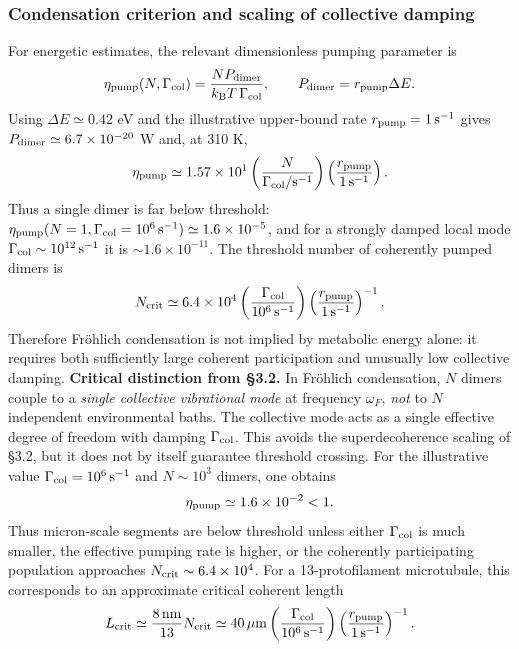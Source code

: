 \documentclass[twocolumn,10pt]{article}
\newcommand{\kB}{k_{\text{B}}}
\begin{document}
\subsubsection{Condensation criterion and scaling of collective damping}
For energetic estimates, the relevant dimensionless pumping parameter is
\begin{equation}
\eta_{\rm pump}(N,\Gamma_{\rm col})
=
\frac{N P_{\rm dimer}}{\kB T\,\Gamma_{\rm col}},
\qquad
P_{\rm dimer}=r_{\rm pump}\Delta E .
\end{equation}
Using $\Delta E\simeq0.42$ eV and the illustrative upper-bound rate
$r_{\rm pump}=1\,{\rm s}^{-1}$ gives
$P_{\rm dimer}\simeq6.7\times10^{-20}$ W and, at 310 K,
\begin{equation}
\eta_{\rm pump}
\simeq
1.57\times10^{1}
\left(\frac{N}{\Gamma_{\rm col}/{\rm s}^{-1}}\right)
\left(\frac{r_{\rm pump}}{1\,{\rm s}^{-1}}\right).
\end{equation}
Thus a single dimer is far below threshold:
$\eta_{\rm pump}(N=1,\Gamma_{\rm col}=10^6\,{\rm s}^{-1})
\simeq1.6\times10^{-5}$, and for a strongly damped local mode
$\Gamma_{\rm col}\sim10^{12}\,{\rm s}^{-1}$ it is
$\sim1.6\times10^{-11}$. The threshold number of coherently pumped dimers is
\begin{equation}
N_{\rm crit}
\simeq
6.4\times10^4
\left(\frac{\Gamma_{\rm col}}{10^6\,{\rm s}^{-1}}\right)
\left(\frac{r_{\rm pump}}{1\,{\rm s}^{-1}}\right)^{-1}.
\end{equation}
Therefore Fr\"ohlich condensation is not implied by metabolic energy alone:
it requires both sufficiently large coherent participation and unusually low
collective damping.
\textbf{Critical distinction from \S 3.2.} In Fr\"ohlich condensation, $N$
dimers couple to a \textit{single collective vibrational mode} at
frequency $\omega_F$, \textit{not} to $N$ independent environmental baths.
The collective mode acts as a single effective degree of freedom with
damping $\Gamma_{\rm col}$. This avoids the superdecoherence scaling of
\S 3.2, but it does not by itself guarantee threshold crossing. For the
illustrative value $\Gamma_{\rm col}=10^6\,{\rm s}^{-1}$ and
$N\sim10^3$ dimers, one obtains
\[
\eta_{\rm pump}\simeq1.6\times10^{-2}<1.
\]
Thus micron-scale segments are below threshold unless either
$\Gamma_{\rm col}$ is much smaller, the effective pumping rate is higher,
or the coherently participating population approaches
$N_{\rm crit}\sim6.4\times10^4$.
For a 13-protofilament microtubule, this corresponds to an approximate
critical coherent length
\[
L_{\rm crit}
\simeq
\frac{8\,{\rm nm}}{13}N_{\rm crit}
\simeq
40\,\mu{\rm m}
\left(\frac{\Gamma_{\rm col}}{10^6\,{\rm s}^{-1}}\right)
\left(\frac{r_{\rm pump}}{1\,{\rm s}^{-1}}\right)^{-1}.
\]
\end{document}
